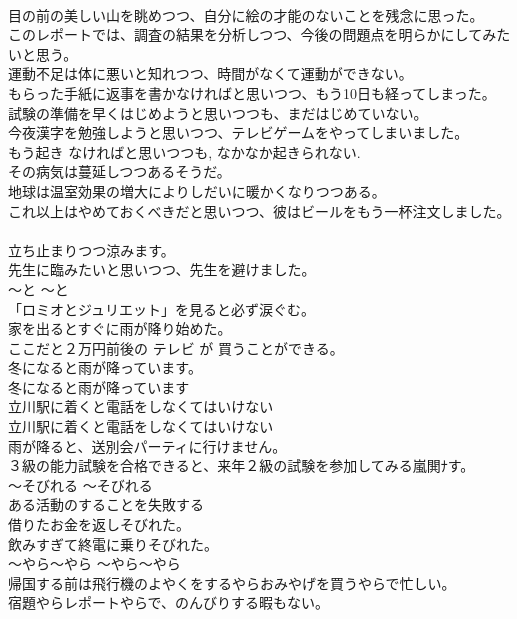 \documentclass[8pt]{extreport}
\begin{document}
\begin{CJK}{UTF8}{min}
\\	目の前の美しい山を眺めつつ、自分に絵の才能のないことを残念に思った。  
\\	このレポートでは、調査の結果を分析しつつ、今後の問題点を明らかにしてみたいと思う。   
\\	運動不足は体に悪いと知れつつ、時間がなくて運動ができない。   
\\	もらった手紙に返事を書かなければと思いつつ、もう10日も経ってしまった。  
\\	試験の準備を早くはじめようと思いつつも、まだはじめていない。  
\\	今夜漢字を勉強しようと思いつつ、テレビゲームをやってしまいました。   
\\	もう起き なければと思いつつも, なかなか起きられない.  
\\	その病気は蔓延しつつあるそうだ。   
\\	地球は温室効果の増大によりしだいに暖かくなりつつある。   
\\	これ以上はやめておくべきだと思いつつ、彼はビールをもう一杯注文しました。   
\\	立ち止まりつつ涼みます。  
\\	先生に臨みたいと思いつつ、先生を避けました。  
\\	〜と	〜と	
\\	「ロミオとジュリエット」を見ると必ず涙ぐむ。  
\\	家を出るとすぐに雨が降り始めた。  
\\	ここだと２万円前後の テレビ が 買うことができる。  
\\	冬になると雨が降っています。  
\\	冬になると雨が降っています 
\\	立川駅に着くと電話をしなくてはいけない  
\\	立川駅に着くと電話をしなくてはいけない 
\\	雨が降ると、送別会パーティに行けません。  
\\	３級の能力試験を合格できると、来年２級の試験を参加してみる嵐閧ﾅす。  
\\	〜そびれる	〜そびれる	
\\	ある活動のすることを失敗する	
\\	借りたお金を返しそびれた。  
\\	飲みすぎて終電に乗りそびれた。  
\\	〜やら〜やら	〜やら〜やら	
\\	帰国する前は飛行機のよやくをするやらおみやげを買うやらで忙しい。  
\\	宿題やらレポートやらで、のんびりする暇もない。  

\end{CJK}
\end{document}
